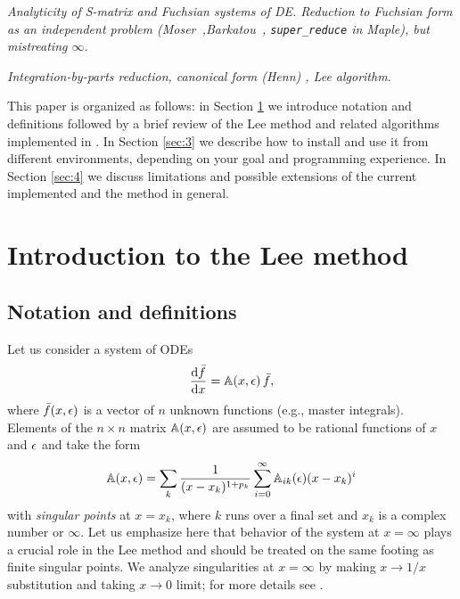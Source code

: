 \documentclass[12pt,a4paper]{article}
\def\M#1{\mathbb{#1}} %
\begin{document}
{\it Analyticity of S-matrix and Fuchsian systems of DE. Reduction to Fuchsian form as an independent problem (Moser~\cite{Mos59},Barkatou~\cite{BP09}, \texttt{super\_reduce} in Maple), but mistreating $\infty$.}

{\it Integration-by-parts reduction, canonical form (Henn) \cite{Henn13}, Lee algorithm.}

This paper is organized as follows: in Section \ref{sec:2} we introduce notation and definitions followed by a brief review of the Lee method \cite{Lee15} and related algorithms implemented in \fuchsia.
In Section \ref{sec:3} we describe how to install \fuchsia and use it from different environments, depending on your goal and programming experience.
In Section \ref{sec:4} we discuss limitations and possible extensions of the current implemented and the method in general.


\section{Introduction to the Lee method}
\label{sec:2}


\subsection{Notation and definitions}

Let us consider a system of ODEs
\begin{equation}
\label{eq:df}
  \frac{\D \bar{f}}{\D x} = \M A(x,\eps)\,\bar{f},
\end{equation}
where $\bar{f}(x,\epsilon)$ is a vector of $n$ unknown functions (e.g., master integrals).
Elements of the $n \times n$ matrix  $\M A(x,\eps)$ are assumed to be rational functions of $x$ and $\epsilon$ and take the form
\begin{equation}
\label{eq:axeps}
  {\M A}(x,\eps) = \sum_k \frac{1}{(x-x_k)^{1+p_k}} \sum_{i=0}^\infty {\M A}_{ik}(\eps) (x-x_k)^i
\end{equation}
with {\em singular points} at $x = x_k$, where $k$ runs over a final set and $x_k$ is a complex number or $\infty$.
Let us emphasize here that behavior of the system at $x=\infty$ plays a crucial role in the Lee method and should be treated on the same footing as finite singular points.
We analyze singularities at $x=\infty$ by making $x\to1/x$ substitution and taking $x\to0$ limit; for more details see \cite{Bal08}.
\end{document}
